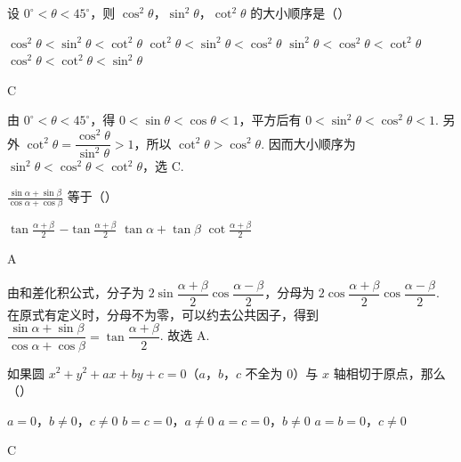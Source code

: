 \begin{problem}
设 \(0^\circ<\theta<45^\circ\)，则 \(\cos^2\theta\)，\(\sin^2\theta\)，\(\cot^2\theta\) 的大小顺序是（\quad）

\choices
    {\(\cos^2\theta<\sin^2\theta<\cot^2\theta\)}
    {\(\cot^2\theta<\sin^2\theta<\cos^2\theta\)}
    {\(\sin^2\theta<\cos^2\theta<\cot^2\theta\)}
    {\(\cos^2\theta<\cot^2\theta<\sin^2\theta\)}
\end{problem}

\begin{answer}
C
\end{answer}

\begin{solution}
由 \(0^\circ<\theta<45^\circ\)，得 \(0<\sin\theta<\cos\theta<1\)，平方后有 \(0<\sin^2\theta<\cos^2\theta<1\). 另外 \(\cot^2\theta=\dfrac{\cos^2\theta}{\sin^2\theta}>1\)，所以 \(\cot^2\theta>\cos^2\theta\). 因而大小顺序为 \(\sin^2\theta<\cos^2\theta<\cot^2\theta\)，选 C.
\end{solution}

\begin{problem}
\(\frac{\sin\alpha+\sin\beta}{\cos\alpha+\cos\beta}\) 等于（\quad）

\choices
    {\(\tan\frac{\alpha+\beta}{2}\)}
    {\(-\tan\frac{\alpha+\beta}{2}\)}
    {\(\tan\alpha+\tan\beta\)}
    {\(\cot\frac{\alpha+\beta}{2}\)}
\end{problem}

\begin{answer}
A
\end{answer}

\begin{solution}
由和差化积公式，分子为 \(2\sin\dfrac{\alpha+\beta}{2}\cos\dfrac{\alpha-\beta}{2}\)，分母为 \(2\cos\dfrac{\alpha+\beta}{2}\cos\dfrac{\alpha-\beta}{2}\). 在原式有定义时，分母不为零，可以约去公共因子，得到
\(\dfrac{\sin\alpha+\sin\beta}{\cos\alpha+\cos\beta}=\tan\dfrac{\alpha+\beta}{2}\). 故选 A.
\end{solution}

\begin{problem}
如果圆 \(x^2+y^2+ax+by+c=0\)（\(a\)，\(b\)，\(c\) 不全为 \(0\)）与 \(x\) 轴相切于原点，那么（\quad）

\choices
    {\(a=0\)，\(b\neq 0\)，\(c\neq 0\)}
    {\(b=c=0\)，\(a\neq 0\)}
    {\(a=c=0\)，\(b\neq 0\)}
    {\(a=b=0\)，\(c\neq 0\)}
\end{problem}

\begin{answer}
C
\end{answer}

